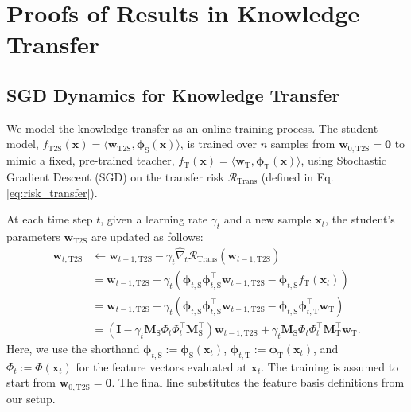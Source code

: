 \documentclass{article}
\theoremstyle{definition}
\theoremstyle{definition}
\theoremstyle{plain}
\theoremstyle{plain}
\theoremstyle{plain}
\theoremstyle{plain}
\theoremstyle{plain}
\newcommand{\bs}[1]{\boldsymbol{\mathbf{#1}}}
\newcommand{\vecx}{\mathbf{x}}
\newcommand{\te}{\mathrm{T}}
\newcommand{\st}{\mathrm{S}}
\newcommand{\ts}{\mathrm{T2S}}
\newcommand{\M}{\mathbf{M}}
\newcommand{\w}{\mathbf{w}}
\newcommand{\id}{\mathbf{I}}
\begin{document}
\section{Proofs of Results in Knowledge Transfer}
\subsection{SGD Dynamics for Knowledge Transfer}
We model the knowledge transfer as an online training process. The student model, $f_\ts(\vecx) = \langle \w_\ts, \bs\phi_\st(\vecx) \rangle$, is trained over $n$ samples from $\w_{0,\ts} = \bs 0$ to mimic a fixed, pre-trained teacher, $f_\te(\vecx) = \langle \w_\te, \bs\phi_\te(\vecx) \rangle$, using Stochastic Gradient Descent (SGD) on the transfer risk $\mathcal{R}_{\mathrm{Trans}}$ (defined in Eq. \ref{eq:risk_transfer}).


At each time step $t$, given a learning rate $\gamma_t$ and a new sample $\vecx_t$, the student's parameters $\w_{\ts}$ are updated as follows:
\begin{equation}
\begin{aligned}
\label{paraupdatets}
\w_{t,\ts} &\leftarrow \w_{t-1,\ts} - \gamma_t \widehat\nabla_{t}\mathcal{R}_\mathrm{Trans}(\w_{t-1,\ts}) \\
&= \w_{t-1,\ts} - \gamma_t \left( \bs\phi_{t,\st}\bs\phi_{t,\st}^\top \w_{t-1,\ts} - \bs\phi_{t,\st}f_\te(\vecx_t) \right) \\
&= \w_{t-1,\ts} - \gamma_t \left( \bs\phi_{t,\st}\bs\phi_{t,\st}^\top \w_{t-1,\ts} - \bs\phi_{t,\st}\bs\phi_{t,\te}^\top \w_\te \right) \\
&= \left(\id-\gamma_t\M_\st\Phi_t\Phi_t^\top\M_\st^\top \right)\w_{t-1,\ts}+\gamma_t \M_\st\Phi_t\Phi_t^\top\M_\te^\top \w_\te.
\end{aligned}
\end{equation}
Here, we use the shorthand $\bs\phi_{t, \st} := \bs\phi_\st(\vecx_t)$, $\bs\phi_{t, \te} := \bs\phi_\te(\vecx_t)$, and $\Phi_t := \Phi(\vecx_t)$ for the feature vectors evaluated at $\vecx_t$. The training is assumed to start from $\w_{0,\ts} = \mathbf{0}$. The final line substitutes the feature basis definitions from our setup.
\end{document}
